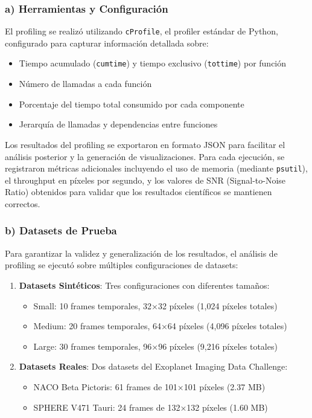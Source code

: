 \subsubsection{a) Herramientas y Configuración}

El profiling se realizó utilizando \texttt{cProfile}, el profiler estándar de Python, configurado para capturar información detallada sobre:
\begin{itemize}
    \item Tiempo acumulado (\texttt{cumtime}) y tiempo exclusivo (\texttt{tottime}) por función
    \item Número de llamadas a cada función
    \item Porcentaje del tiempo total consumido por cada componente
    \item Jerarquía de llamadas y dependencias entre funciones
\end{itemize}

Los resultados del profiling se exportaron en formato JSON para facilitar el análisis posterior y la generación de visualizaciones. Para cada ejecución, se registraron métricas adicionales incluyendo el uso de memoria (mediante \texttt{psutil}), el throughput en píxeles por segundo, y los valores de SNR (Signal-to-Noise Ratio) obtenidos para validar que los resultados científicos se mantienen correctos.

\subsubsection{b) Datasets de Prueba}

Para garantizar la validez y generalización de los resultados, el análisis de profiling se ejecutó sobre múltiples configuraciones de datasets:

\begin{enumerate}
    \item \textbf{Datasets Sintéticos}: Tres configuraciones con diferentes tamaños:
    \begin{itemize}
        \item Small: 10 frames temporales, 32×32 píxeles (1,024 píxeles totales)
        \item Medium: 20 frames temporales, 64×64 píxeles (4,096 píxeles totales)
        \item Large: 30 frames temporales, 96×96 píxeles (9,216 píxeles totales)
    \end{itemize}
    
    \item \textbf{Datasets Reales}: Dos datasets del Exoplanet Imaging Data Challenge:
    \begin{itemize}
        \item NACO Beta Pictoris: 61 frames de 101×101 píxeles (2.37 MB)
        \item SPHERE V471 Tauri: 24 frames de 132×132 píxeles (1.60 MB)
    \end{itemize}
\end{enumerate}

